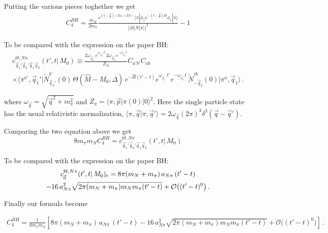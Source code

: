 \documentclass[10pt,a4paper]{article}
\begin{document}
Putting the various pieces toghether we get
\begin{gather}
C_4^{BH}=\frac{m_N}{ 2 m_\pi }\frac{
  e^{ (t-\frac{T}{8})(E_N+E\pi)} \langle \pi|   \phi_1 e^{-(t-\frac{T}{8})H}\phi_1 
 | \pi\rangle  
}{
 |\langle 0| N | \pi\rangle|^2  
}-1
\end{gather}
\begin{tcolorbox}
{To be compared with the expression on the  paper BH:
 \begin{multline}
\label{eq:cThetaNpiDef}
c^{\Theta, N \pi}_{\vec q_1' \vec q_2' \vec q_1 \vec q_2}(t', t \vert \, M_0) \equiv \frac{ 2 \omega_{\vec q_2'} e^{\omega_{\vec q_2'} t' } 2 \omega_{\vec q_2 } e^{- \omega_{\vec q_2 } t } }{Z_N} C_{a'b'} C_{ab} \, \\
\times \langle \pi^{a'} , \vec q_1' \vert \widetilde N^{b'}_{ \vec q_2'}(0) \, \Theta(\hat M - M_0, \Delta) \, e^{- \hat H(t' - t)} e^{ \omega_{\vec q_1'} t'} e^{ - \omega_{\vec q_1} t} \, \widetilde N^{\dagger b}_{-\vec q_2}(0) \vert \pi^{a}, \vec q_1 \rangle \,.
\nonumber
\end{multline}
}
\end{tcolorbox}

\begin{tcolorbox}
where $\omega_{\vec q} = \sqrt{\vec q^2 + m_\pi^2}$ and $Z_\pi = \langle \pi, \vec p \vert \pi(0) \vert 0 \rangle^2$. Here the single particle state has the usual relativistic normalization, $\langle \pi, \vec q \vert \pi, \vec q' \rangle = 2 \omega_{\vec q} (2 \pi)^3 \delta^3(\vec q - \vec q')$.
\end{tcolorbox}
Comparing the two equation above we get 
\begin{equation}
8m_\pi m_N C_4^{BH}=  c^{\Theta, N \pi}_{\vec q_1' \vec q_2' \vec q_1 \vec q_2}(t', t \vert \, M_0)
\end{equation}
 
 \begin{tcolorbox}
 To be compared with the expression on the  paper BH:
 \begin{multline}
c^{\Theta, N \pi}_{\vec 0}(t', t \vert \, M_0) _{\sf c} = 8 \pi (m_N + m_\pi) \, a_{N\pi} \, (t' - t ) \\
- 16 \, a_{N \pi}^2 \sqrt{2 \pi (m_N + m_\pi) m_N m_\pi (t'-t)} + \mathcal O \big ((t'-t)^0\big) \,.\nonumber
\end{multline}
 \end{tcolorbox}
Finally our formula become 

\begin{multline}
 C_4^{BH}=  \frac{1}{8m_\pi m_N}\left[ 8 \pi (m_N + m_\pi) \, a_{N\pi} \, (t' - t ) 
- 16 \, a_{N \pi}^2 \sqrt{2 \pi (m_N + m_\pi) m_N m_\pi (t'-t)} + \mathcal O \big ((t'-t)^0\big) \right]\,.\nonumber
\end{multline} 
 
 
 
 
 
\end{document}
